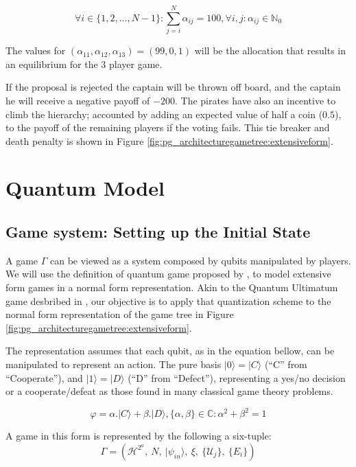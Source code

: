 \documentclass[10pt,twocolumn]{llncs}
\begin{document}
\begin{equation}
\label{eq:goodss}
\forall i \in \{1 , 2, ..., N-1\} : \sum_{j=i}^{N}\alpha_{ij}=100, \forall i,j :\alpha_{ij}\in\mathbb{N}_{0}
\end{equation}

The values for $(\alpha_{11}, \alpha_{12}, \alpha_{13})=(99, 0, 1)$ will be the allocation that results in an equilibrium for the $3$ player game. 


If the proposal is rejected the captain will be thrown off board, and the captain he will receive a negative payoff of $-200$. The pirates have also an incentive to climb the hierarchy; accounted by adding an expected value of half a coin ($0.5$), to the payoff of the remaining players if the voting fails. This tie breaker and death penalty is shown in Figure \ref{fig:pg_architecturegametree:extensiveform}.

\section{Quantum Model}
\subsection{Game system: Setting up the Initial State}
\label{subsec:pirates_initialstate}

A game $\Gamma$ can be viewed as a system composed by qubits manipulated by players. We will use the definition of quantum game proposed by \cite{Fra2011a}, to model extensive form games in a normal form representation. Akin to the Quantum Ultimatum game desbribed in \cite{Fra2011}, our objective is to apply that quantization scheme to the normal form representation of the game tree in Figure \ref{fig:pg_architecturegametree:extensiveform}. 

The representation assumes that each qubit, as in the equation bellow, can be manipulated to represent an action. The pure basis $\vert 0\rangle = \vert C\rangle$ (``C'' from ``Cooperate''), and $\vert 1\rangle = \vert D\rangle$ (``D'' from ``Defect''), representing a yes/no decision or a cooperate/defeat as
those found in many classical game theory problems.

\begin{equation}
\varphi = \alpha . \vert C \rangle + \beta . \vert D \rangle, \{ \alpha ,\beta \} \in \mathbb{C} : \alpha^2 + \beta^2 =1
\end{equation}

A game in this
form is represented by the following a six-tuple:
\begin{equation}
\Gamma=(\mathcal{H}^{2^{a}},\: N,\:\vert\psi_{in}\rangle,\:\xi,\:\{\mathcal{U}_{j}\},\:\{E_{i}\})\label{eq:quantum_game_six_tuple}
\end{equation}
\end{document}
